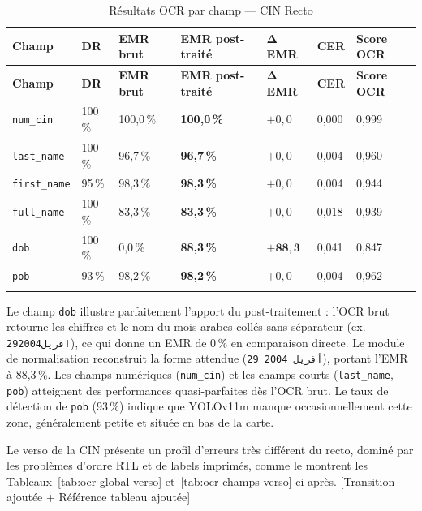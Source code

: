 \renewcommand{\arraystretch}{1.35}
\setlength{\LTleft}{0pt plus 1fill}
\setlength{\LTright}{0pt plus 1fill}
\begin{longtable}{|p{2.8cm}|p{1.3cm}|p{1.8cm}|p{2.5cm}|p{1.8cm}|p{1.3cm}|p{2cm}|}
  \hline
  \rowcolor{bleu_principal!15}
  \textbf{Champ} & \textbf{DR} & \textbf{EMR brut} & \textbf{EMR post-traité} & $\boldsymbol{\Delta}$\textbf{EMR} & \textbf{CER} & \textbf{Score OCR} \\
  \hline
  \endfirsthead
  \hline
  \rowcolor{bleu_principal!15}
  \textbf{Champ} & \textbf{DR} & \textbf{EMR brut} & \textbf{EMR post-traité} & $\boldsymbol{\Delta}$\textbf{EMR} & \textbf{CER} & \textbf{Score OCR} \\
  \hline
  \endhead
  \texttt{num\_cin}   & 100\,\% & 100,0\,\% & \textbf{100,0\,\%} & $+0{,}0$   & 0,000 & 0,999 \\
  \hline
  \texttt{last\_name} & 100\,\% & 96,7\,\%  & \textbf{96,7\,\%}  & $+0{,}0$   & 0,004 & 0,960 \\
  \hline
  \texttt{first\_name}& 95\,\%  & 98,3\,\%  & \textbf{98,3\,\%}  & $+0{,}0$   & 0,004 & 0,944 \\
  \hline
  \texttt{full\_name} & 100\,\% & 83,3\,\%  & \textbf{83,3\,\%}  & $+0{,}0$   & 0,018 & 0,939 \\
  \hline
  \texttt{dob}        & 100\,\% & 0,0\,\%   & \textbf{88,3\,\%}  & $\mathbf{+88{,}3}$ & 0,041 & 0,847 \\
  \hline
  \texttt{pob}        & 93\,\%  & 98,2\,\%  & \textbf{98,2\,\%}  & $+0{,}0$   & 0,004 & 0,962 \\
  \hline
  \caption{Résultats OCR par champ --- CIN Recto}
  \label{tab:ocr-champs-recto}
\end{longtable}

\noindent Le champ \texttt{dob} illustre parfaitement l'apport du post-traitement : l'OCR brut retourne les chiffres et le nom du mois arabes collés sans séparateur (ex. \texttt{29افريل2004}), ce qui donne un EMR de 0\,\% en comparaison directe. Le module de normalisation reconstruit la forme attendue (\texttt{29 أفريل 2004}), portant l'EMR à 88,3\,\%. Les champs numériques (\texttt{num\_cin}) et les champs courts (\texttt{last\_name}, \texttt{pob}) atteignent des performances quasi-parfaites dès l'OCR brut. Le taux de détection de \texttt{pob} (93\,\%) indique que YOLOv11m manque occasionnellement cette zone, généralement petite et située en bas de la carte.

\medskip

Le verso de la CIN présente un profil d'erreurs très différent du recto, dominé par les problèmes d'ordre RTL et de labels imprimés, comme le montrent les Tableaux~\ref{tab:ocr-global-verso} et~\ref{tab:ocr-champs-verso} ci-après. [Transition ajoutée + Référence tableau ajoutée]

